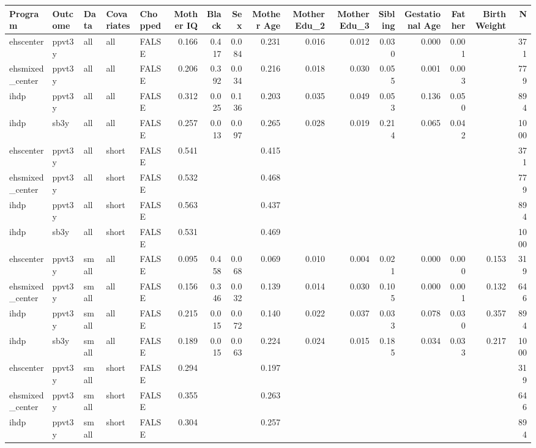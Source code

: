 \begin{table}[ht]
\centering
\begin{tabular}{lllllrrrrrrrrrrr}
  \hline
Program & Outcome & Data & Covariates & Chopped & Mother IQ & Black & Sex & Mother Age & Mother Edu\_2 & Mother Edu\_3 & Sibling & Gestational Age & Father & Birth Weight & N \\ 
  \hline
ehscenter & ppvt3y & all & all & FALSE & 0.166 & 0.417 & 0.084 & 0.231 & 0.016 & 0.012 & 0.030 & 0.000 & 0.001 &  & 371 \\ 
  ehsmixed\_center & ppvt3y & all & all & FALSE & 0.206 & 0.392 & 0.034 & 0.216 & 0.018 & 0.030 & 0.055 & 0.001 & 0.003 &  & 779 \\ 
  ihdp & ppvt3y & all & all & FALSE & 0.312 & 0.025 & 0.136 & 0.203 & 0.035 & 0.049 & 0.053 & 0.136 & 0.050 &  & 894 \\ 
  ihdp & sb3y & all & all & FALSE & 0.257 & 0.013 & 0.097 & 0.265 & 0.028 & 0.019 & 0.214 & 0.065 & 0.042 &  & 1000 \\ 
  ehscenter & ppvt3y & all & short & FALSE & 0.541 &  &  & 0.415 &  &  &  &  &  &  & 371 \\ 
  ehsmixed\_center & ppvt3y & all & short & FALSE & 0.532 &  &  & 0.468 &  &  &  &  &  &  & 779 \\ 
  ihdp & ppvt3y & all & short & FALSE & 0.563 &  &  & 0.437 &  &  &  &  &  &  & 894 \\ 
  ihdp & sb3y & all & short & FALSE & 0.531 &  &  & 0.469 &  &  &  &  &  &  & 1000 \\ 
  ehscenter & ppvt3y & small & all & FALSE & 0.095 & 0.458 & 0.068 & 0.069 & 0.010 & 0.004 & 0.021 & 0.000 & 0.000 & 0.153 & 319 \\ 
  ehsmixed\_center & ppvt3y & small & all & FALSE & 0.156 & 0.346 & 0.032 & 0.139 & 0.014 & 0.030 & 0.105 & 0.000 & 0.001 & 0.132 & 646 \\ 
  ihdp & ppvt3y & small & all & FALSE & 0.215 & 0.015 & 0.072 & 0.140 & 0.022 & 0.037 & 0.033 & 0.078 & 0.030 & 0.357 & 894 \\ 
  ihdp & sb3y & small & all & FALSE & 0.189 & 0.015 & 0.063 & 0.224 & 0.024 & 0.015 & 0.185 & 0.034 & 0.033 & 0.217 & 1000 \\ 
  ehscenter & ppvt3y & small & short & FALSE & 0.294 &  &  & 0.197 &  &  &  &  &  &  & 319 \\ 
  ehsmixed\_center & ppvt3y & small & short & FALSE & 0.355 &  &  & 0.263 &  &  &  &  &  &  & 646 \\ 
  ihdp & ppvt3y & small & short & FALSE & 0.304 &  &  & 0.257 &  &  &  &  &  &  & 894 \\ 

\end{tabular}
\end{table}
